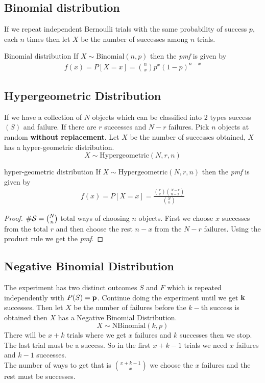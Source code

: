 \documentclass[16pt,a4paper]{article}
\begin{document}
\subsection{Binomial distribution}
If we repeat independent Bernoulli trials with the same probability of success $p$, each $n$ times then let $X$ be the number of successes among $n$ trials. 
\begin{thm}{Binomial distribution}
    If $X\sim \text{Binomial}(n,p)$ then the \textit{pmf} is given by 
    \begin{align*}
        f(x) = P[X=x] = {n\choose x}p^x(1-p)^{n-x}
    \end{align*}
\end{thm}
\newpage
\subsection{Hypergeometric Distribution}
If we have a collection of $N$ objects which can be classified into 2 types success $(S)$ and failure. If there are $r$ successes and $N-r$ failures. Pick $n$ objects at random \textbf{without replacement}. Let $X$ be the number of successes obtained, $X$ has a hyper-geometric distribution. 
\\
\[
    X \sim \text{Hypergeometric}(N,r,n)
\]  
\begin{thm}{hyper-geometric distribution}
    If $X \sim \text{Hypergeometric}(N,r,n)$ then the \textit{pmf} is given by 
    \begin{align*}
        f(x) = P[X=x] = \frac{{r\choose x}{N-r\choose n-x}}{{N\choose n}}
    \end{align*}
    \begin{proof}
        $\# {\cal S} = {N \choose n}$ total ways of choosing $n$ objects. First we choose $x$ successes from the total $r$ and then choose the rest $n-x$ from the $N-r$ failures. Using the product rule we get the \textit{pmf}. 
    \end{proof}
\end{thm}
\newpage
\subsection{Negative Binomial Distribution}
The experiment has two distinct outcomes $S$ and $F$ which is repeated independently with $P(S) = {\bf p}$. Continue doing the experiment until we get ${\bf k}$ successes. Then let $X$ be the number of failures before the $k-$th success is obtained then $X$ has a Negative Binomial Distribution. 
\[
    X\sim \text{NBinomial}(k,p)
\]  
There will be $x+k$ trials where we get $x$ failures and $k$ successes then we stop. The last trial must be a success. So in the first $x+k-1$ trials we need $x$ failures and $k-1$ successes. 
\\
The number of ways to get that is ${x+k-1\choose x}$ we choose the $x$ failures and the rest must be successes. 
\end{document}
